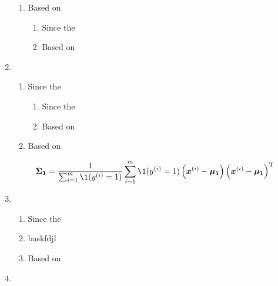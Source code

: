 \documentclass[a4paper]{article}
\begin{document}
\begin{enumerate}
\begin{enumerate}
  
  \item Based on 
  \begin{enumerate}
    \item Since the 
    
    
    \item Based on 
  \end{enumerate}
\end{enumerate}

\item 
\begin{enumerate}
  \item Since the 
  \begin{enumerate}
    \item Since the 
    
    
    \item Based on 
  \end{enumerate}
  
  
  \item Based on 
\end{enumerate}


\begin{equation*}
  \boldsymbol{\Sigma_{1}} = \frac{1}{\sum_{i=1}^{m} \1 (y^{(i)}=1)} \sum_{i=1}^{m}\1 (y^{(i)}=1)\left(\boldsymbol{x}^{(i)}-\boldsymbol{\mu_{1}}\right)\left(\boldsymbol{x}^{(i)}-\boldsymbol{\mu_{1}}\right)^{\mathrm{T}}
\end{equation*}


\item 
\begin{enumerate}
  \item Since the 
  
  \item baskfdjl
  
  \item Based on 
\end{enumerate}


\item 



\end{enumerate}
\end{document}
